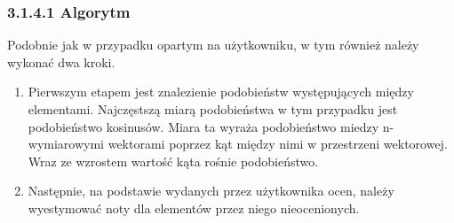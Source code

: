 \documentclass[12pt,a4paper]{report}
\begin{document}
\subsubsection{3.1.4.1 Algorytm}
Podobnie jak w przypadku opartym na użytkowniku, w tym również należy wykonać dwa kroki.
\begin{enumerate}
\item Pierwszym etapem jest znalezienie podobieństw występujących między elementami. Najczęstszą miarą podobieństwa w tym przypadku jest podobieństwo kosinusów. Miara ta wyraża podobieństwo miedzy n-wymiarowymi wektorami poprzez kąt między nimi w przestrzeni wektorowej. Wraz ze wzrostem wartość kąta rośnie podobieństwo.
\item Następnie, na podstawie wydanych przez użytkownika ocen, należy wyestymować noty dla elementów przez niego nieocenionych.
\end{enumerate}
\end{document}
